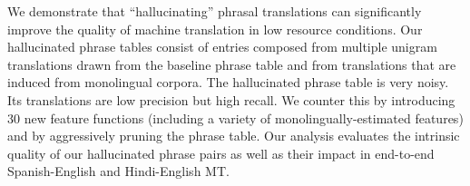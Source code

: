 We demonstrate that ``hallucinating'' phrasal translations can significantly improve the quality of machine translation in low resource conditions. Our hallucinated phrase tables consist of entries composed from multiple unigram translations drawn from the baseline phrase table and from translations that are induced from monolingual corpora. The hallucinated phrase table is very noisy. Its translations are low precision but high recall. We counter this by introducing 30 new feature functions (including a variety of monolingually-estimated features) and by aggressively pruning the phrase table. Our analysis evaluates the intrinsic quality of our hallucinated phrase pairs as well as their impact in end-to-end Spanish-English and Hindi-English MT.
